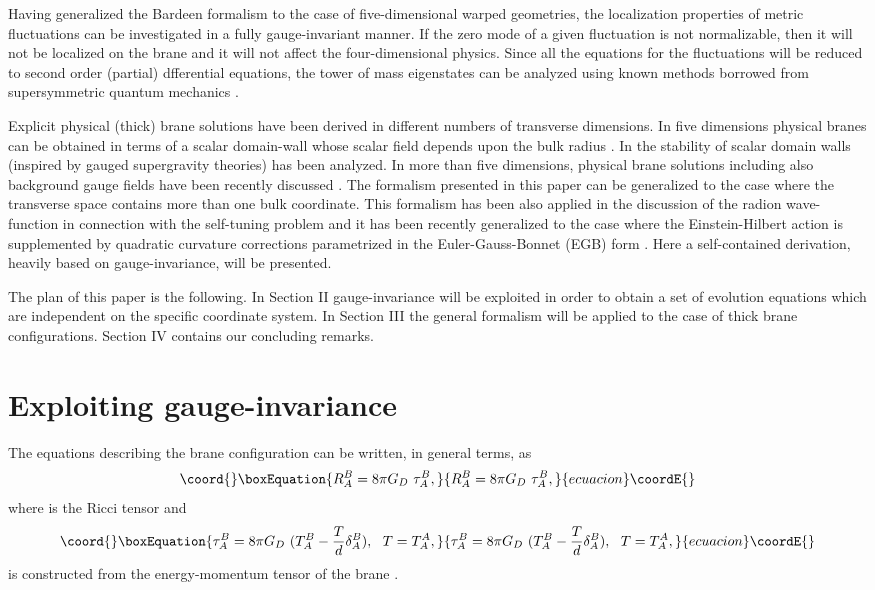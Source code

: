 \documentclass[a4paper,12pt]{article}
\begin{document}
Having generalized the Bardeen 
formalism to the case of five-dimensional warped geometries, 
the localization properties of metric 
fluctuations can be investigated in a fully gauge-invariant
manner. If the zero mode of a given fluctuation is 
not normalizable, then it will not be localized on the brane and 
it will not affect the four-dimensional physics. Since 
all the equations for the fluctuations will be reduced 
to second order (partial) dfferential equations, the tower 
of mass eigenstates can be analyzed using known methods 
borrowed from supersymmetric quantum mechanics \cite{susqm}.

Explicit physical (thick) brane solutions have  been derived 
in different numbers of transverse dimensions. In five dimensions 
physical branes can be obtained in terms  of a scalar domain-wall whose 
 scalar field depends upon the bulk radius \cite{kt1,kt2,gremm1,gremm2}. 
In \cite{free,free2} the stability of scalar domain walls (inspired by gauged 
supergravity theories) has been analyzed. 
In more than five dimensions, physical brane solutions including  also 
 background gauge fields have been recently discussed \cite{gms,gm}. 
The formalism presented in this paper can be generalized to the case 
where the transverse space contains more than one bulk coordinate. 
This formalism has been also applied in the 
discussion of the radion wave-function in connection 
with the self-tuning problem \cite{kim} and it has been 
recently generalized to the case where 
the Einstein-Hilbert 
action is supplemented by quadratic 
curvature corrections parametrized in the Euler-Gauss-Bonnet (EGB) 
form \cite{n3}. Here a self-contained derivation, heavily based 
on gauge-invariance, will be presented.

The plan of this paper is the following. In Section II 
 gauge-invariance will be exploited in order to obtain a set of 
evolution equations which are independent on the specific 
coordinate system. In Section III the general formalism 
will be applied to the case of thick brane configurations. Section IV contains 
our concluding remarks. 

\renewcommand{\theequation}{2.\arabic{equation}}
\setcounter{equation}{0}
\section{Exploiting gauge-invariance} 
The equations describing the brane configuration can be written, in 
general terms, as
\begin{equation}\coord{}\boxEquation{
R_{A}^{B} = 8 \pi G_{D} ~\tau_{A}^{B},
\label{ce}
}{
R_{A}^{B} = 8 \pi G_{D} ~\tau_{A}^{B},
}{ecuacion}\coordE{}\end{equation}
where \coordHE{} is the Ricci tensor and 
\begin{equation}\coord{}\boxEquation{
\tau_{A}^{B} = 8 \pi G_{D}~(T_{A}^{B} - 
\frac{T}{d}\delta_{A}^{B}), \,\,\,\, T= T_{A}^{A},
}{
\tau_{A}^{B} = 8 \pi G_{D}~(T_{A}^{B} - 
\frac{T}{d}\delta_{A}^{B}), \,\,\,\, T= T_{A}^{A},
}{ecuacion}\coordE{}\end{equation}
is constructed from the energy-momentum tensor of the brane \coordHE{}.
\end{document}

